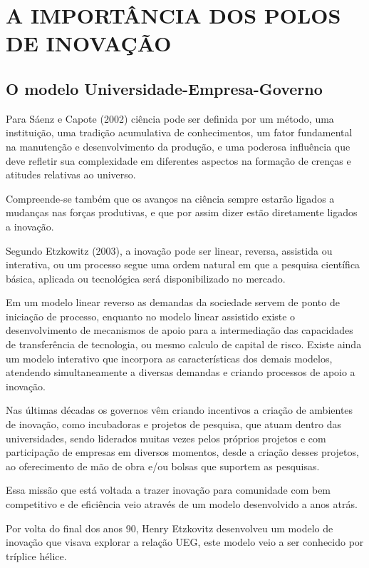 \chapter{A IMPORTÂNCIA DOS POLOS DE INOVAÇÃO}
\thispagestyle{empty}

\section{O modelo Universidade-Empresa-Governo}

Para Sáenz e Capote (2002) ciência pode ser definida por um método, uma instituição, uma tradição acumulativa de conhecimentos, um fator fundamental na manutenção e desenvolvimento da produção, e uma poderosa influência que deve refletir sua complexidade em diferentes aspectos na formação de crenças e atitudes relativas ao universo.

Compreende-se também que os avanços na ciência sempre estarão ligados a mudanças nas forças produtivas, e que por assim dizer estão diretamente ligados a inovação.

Segundo Etzkowitz (2003), a inovação pode ser linear, reversa, assistida ou interativa, ou um processo segue uma ordem natural em que a pesquisa científica básica, aplicada ou tecnológica será disponibilizado no mercado.

Em um modelo linear reverso as demandas da sociedade servem de ponto de iniciação de processo, enquanto no modelo linear assistido existe o desenvolvimento de mecanismos de apoio para a intermediação das capacidades de transferência de tecnologia, ou mesmo calculo de capital de risco. Existe ainda um modelo interativo que incorpora as características dos demais modelos, atendendo simultaneamente a diversas demandas e criando processos de apoio a inovação.

Nas últimas décadas os governos vêm criando incentivos a criação de ambientes de inovação, como incubadoras e projetos de pesquisa, que atuam dentro das universidades, sendo liderados muitas vezes pelos próprios projetos e com participação de empresas em diversos momentos, desde a criação desses projetos, ao oferecimento de mão de obra e/ou bolsas que suportem as pesquisas.

Essa missão que está voltada a trazer inovação para comunidade com bem competitivo e de eficiência veio através de um modelo desenvolvido a anos atrás.

Por volta do final dos anos 90, Henry Etzkovitz desenvolveu um modelo de inovação que visava explorar a relação UEG, este modelo veio a ser conhecido por tríplice hélice.

